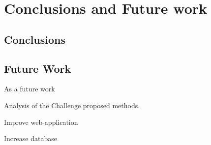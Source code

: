 \chapter{Conclusions and Future work} \label{chap:conclusions}

\section{Conclusions}

\section{Future Work}

As a future work 

Analysis of the Challenge proposed methods.

Improve web-application

Increase database